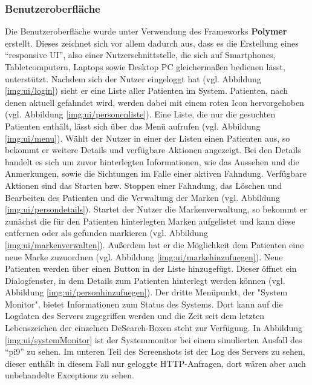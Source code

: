 \subsubsection{Benutzeroberfläche}\label{sssec:ui}
Die Benutzeroberfläche wurde unter Verwendung des Frameworks \textbf{Polymer} erstellt. Dieses zeichnet sich vor allem dadurch aus, dass es die Erstellung eines \enquote{responsive UI}, also einer Nutzerschnittstelle, die sich auf Smartphones, Tabletcomputern, Laptops sowie Desktop PC gleichermaßen bedienen lässt, unterstützt.\newline
Nachdem sich der Nutzer eingeloggt hat (vgl. Abbildung \ref{img:ui/login}) sieht er eine Liste aller Patienten im System. Patienten, nach denen aktuell gefahndet wird, werden dabei mit einem roten Icon hervorgehoben (vgl. Abbildung \ref{img:ui/personenliste}). Eine Liste, die nur die gesuchten Patienten enthält, lässt sich über das Menü aufrufen (vgl. Abbildung \ref{img:ui/menu}). \newline
Wählt der Nutzer in einer der Listen einen Patienten aus, so bekommt er weitere Details und verfügbare Aktionen angezeigt. Bei den Details handelt es sich um zuvor hinterlegten Informationen, wie das Aussehen und die Anmerkungen, sowie die Sichtungen im Falle einer aktiven Fahndung. Verfügbare Aktionen sind das Starten bzw. Stoppen einer Fahndung, das Löschen und Bearbeiten des Patienten und die Verwaltung der Marken (vgl. Abbildung \ref{img:ui/persondetails}). \newline
Startet der Nutzer die Markenverwaltung, so bekommt er zunächst die für den Patienten hinterlegten Marken aufgelistet und kann diese entfernen oder als gefunden markieren (vgl. Abbildung \ref{img:ui/markenverwalten}). Außerdem hat er die Möglichkeit dem Patienten eine neue Marke zuzuordnen (vgl. Abbildung \ref{img:ui/markehinzufuegen}). \newline
Neue Patienten werden über einen Button in der Liste hinzugefügt. Dieser öffnet ein Dialogfenster, in dem Details zum Patienten hinterlegt werden können (vgl. Abbildung \ref{img:ui/personhinzufuegen}).\newline
Der dritte Menüpunkt, der "System Monitor", bietet Informationen zum Status des Systems. Dort kann auf die Logdaten des Servers zugegriffen werden und die Zeit seit dem letzten Lebenszeichen der einzelnen DeSearch-Boxen steht zur Verfügung. In Abbildung \ref{img:ui/systemMonitor} ist der Systemmonitor bei einem simulierten Ausfall des \enquote{pi9} zu sehen. Im unteren Teil des Screenshots ist der Log des Servers zu sehen, dieser enthält in diesem Fall nur geloggte HTTP-Anfragen, dort wären aber auch unbehandelte Exceptions zu sehen.

